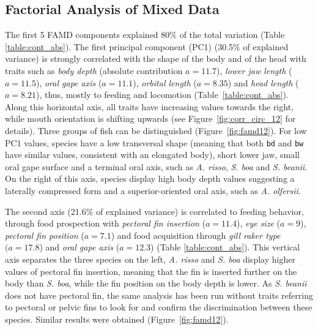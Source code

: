 
\subsection{Factorial Analysis of Mixed Data}

The first 5 FAMD components explained 80\% of the total variation (Table \ref{table:cont_abs}). The first principal component (PC1) (30.5\% of explained variance) is strongly correlated with the shape of the body and of the head with traits such as \emph{body depth} (absolute contribution $a = 11.7$), \emph{lower jaw length} ($a=11.5$), \emph{oral gape axis} ($a=11.1$), \emph{orbital length} ($a = 8.35$) and \emph{head length} ($a = 8.21$), thus, mostly to feeding and locomotion (Table~\ref{table:cont_abs}). Along this horizontal axis, all traits have increasing values towards the right, while mouth orientation is shifting upwards (see Figure~\ref{fig:corr_circ_12} for details). Three groups of fish can be distinguished (Figure~\ref{fig:famd12}). For low PC1 values, species have a low transversal shape (meaning that both \texttt{bd} and \texttt{bw} have similar values, consistent with an elongated body), short lower jaw, small oral gape surface and a terminal oral axis, such as \textit{A. risso}, \textit{S. boa} and \textit{S. beanii}. On the right of this axis, species display high body depth values suggesting a laterally compressed form and a superior-oriented oral axis, such as \textit{A. olfersii}. 

The second axis (21.6\% of explained variance) is correlated to feeding behavior, through food prospection with \emph{pectoral fin insertion} ($a = 11.4$), \emph{eye size} ($a = 9$), \emph{pectoral fin position} ($a = 7.1$) and food acquisition through \emph{gill raker type} $(a = 17.8$) and \emph{oral gape axis} ($a = 12.3$) (Table \ref{table:cont_abs}). This vertical axis separates the three species on the left, \textit{A. risso} and \textit{S. boa} display higher values of pectoral fin insertion, meaning that the fin is inserted further on the body than \textit{S. boa}, while the fin position on the body depth is lower. As \textit{S. beanii} does not have pectoral fin, the same analysis has been run without traits referring to pectoral or pelvic fins to look for and confirm the discrimination between these species. Similar results were obtained (Figure~\ref{fig:famd12}).


